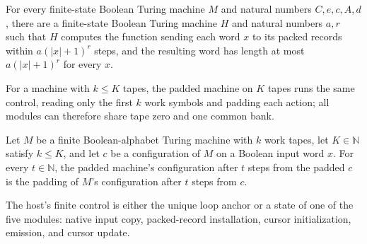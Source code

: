 \begin{lemma}
\label{Complexity.clPackedRecords_machine}
\leanok
{}
For every finite-state Boolean Turing machine $M$ and natural numbers $C,e,c,A,d$, there
are a finite-state Boolean Turing machine $H$ and natural numbers $a,r$ such that $H$
computes the function sending each word $x$ to its packed records within $a(|x|+1)^r$
steps, and the resulting word has length at most $a(|x|+1)^r$ for every $x$.
\end{lemma}

\begin{definition}
\label{Complexity.clA5PadTM}
\leanok
{}
For a machine with $k \le K$ tapes, the padded machine on $K$ tapes runs the same control, reading only the first $k$ work symbols and padding each action; all modules can therefore share tape zero and one common bank.
\end{definition}

\begin{lemma}
\label{Complexity.clA5Pad_run}
\leanok
{}
Let $M$ be a finite Boolean-alphabet Turing machine with $k$ work tapes, let
$K\in\mathbb{N}$ satisfy $k\le K$, and let $c$ be a configuration of $M$ on a Boolean
input word $x$. For every $t\in\mathbb{N}$, the padded machine's configuration after $t$
steps from the padded $c$ is the padding of $M$'s configuration after $t$ steps from
$c$.
\end{lemma}

\begin{definition}
\label{Complexity.CLA5HostState}
\leanok
{}
The host's finite control is either the unique loop anchor or a state of one of the five modules: native input copy, packed-record installation, cursor initialization, emission, and cursor update.
\end{definition}

